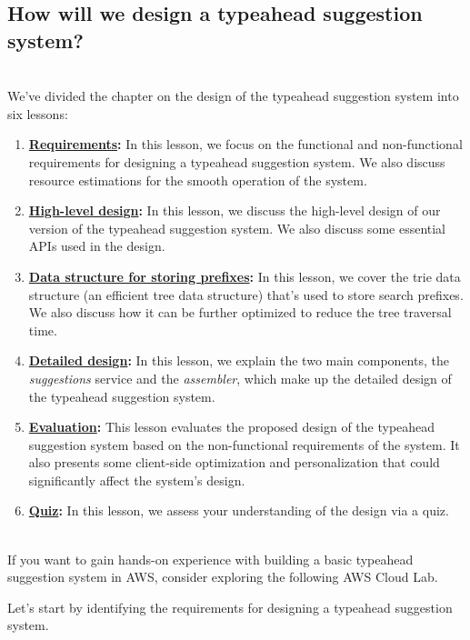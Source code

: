 \subsection{How will we design a typeahead suggestion system?}\label{3ZGdaDuhe92I2ItiXqPF3}
\\
We've divided the chapter on the design of the typeahead suggestion system into six lessons:

\begin{enumerate}
\item
\protect{}\label{2HZNjGT8tbAG4VcktEZjw}
\href{https://www.educative.io/courses/grokking-the-system-design-interview/requirements-of-the-typeahead-suggestion-systems-design}{\textbf{Requirements}}\textbf{:} In this lesson, we focus on the functional and non-functional requirements for designing a typeahead suggestion system. We also discuss resource estimations for the smooth operation of the system.
\item
\protect{}\label{WMR-WZuUUPzV6Q_UvWAQq}
\href{https://www.educative.io/courses/grokking-the-system-design-interview/high-level-design-of-the-typeahead-suggestion-system}{\textbf{High-level design}}\textbf{:} In this lesson, we discuss the high-level design of our version of the typeahead suggestion system. We also discuss some essential APIs used in the design.
\item
\protect{}\label{rLMIL5OH3Ti6EHcfuOISm}
\href{https://www.educative.io/courses/grokking-the-system-design-interview/data-structure-for-storing-prefixes}{\textbf{Data structure for storing prefixes}}\textbf{:} In this lesson, we cover the trie data structure (an efficient tree data structure) that's used to store search prefixes. We also discuss how it can be further optimized to reduce the tree traversal time.
\item
\protect{}\label{CC7qWTVzp2MI-Xj6B-wY4}
\href{https://www.educative.io/courses/grokking-the-system-design-interview/detailed-design-of-the-typeahead-suggestion-system}{\textbf{Detailed design}}\textbf{:} In this lesson, we explain the two main components, the \emph{suggestions} service and the \emph{assembler}, which make up the detailed design of the typeahead suggestion system.
\item
\protect{}\label{VVdXoVbvltq6WxezZ9hB7}
\href{https://www.educative.io/courses/grokking-the-system-design-interview/evaluation-of-the-typeahead-suggestion-systems-design}{\textbf{Evaluation}}\textbf{:} This lesson evaluates the proposed design of the typeahead suggestion system based on the non-functional requirements of the system. It also presents some client-side optimization and personalization that could significantly affect the system's design.
\item
\protect{}\label{t3NPcKnOZfFqo9JWoxmf-}
\href{https://www.educative.io/courses/grokking-the-system-design-interview/quiz-on-the-typeahead-suggestion-systems-design}{\textbf{Quiz}}\textbf{:} In this lesson, we assess your understanding of the design via a quiz.
\end{enumerate}
\\
If you want to gain hands-on experience with building a basic typeahead suggestion system in AWS, consider exploring the following AWS Cloud Lab.

Let's start by identifying the requirements for designing a typeahead suggestion system.

